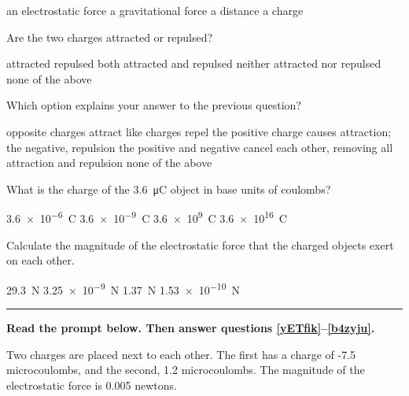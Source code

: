 \documentclass{exam}
\begin{document}
\begin{questions}
\begin{randomizechoices}
    \correctchoice an electrostatic force
    \choice a gravitational force
    \choice a distance
    \choice a charge
\end{randomizechoices}

\question
Are the two charges attracted or repulsed?

\begin{randomizechoices}[keeplast]
    \choice attracted
    \correctchoice repulsed
    \choice both attracted and repulsed
    \choice neither attracted nor repulsed
    \choice none of the above
\end{randomizechoices}

\question
Which option explains your answer to the previous question?

\begin{randomizechoices}[keeplast]
    \choice opposite charges attract
    \correctchoice like charges repel
    \choice the positive charge causes attraction; the negative, repulsion
    \choice the positive and negative cancel each other, removing all attraction and repulsion
    \choice none of the above
\end{randomizechoices}

\question
What is the charge of the \qty{3.6}{\micro C} object in base units of coulombs?

\begin{randomizechoices}
    \correctchoice \qty{3.6e-6}{C}
    \choice \qty{3.6e-9}{C}
    \choice \qty{3.6e9}{C}
    \choice \qty{3.6e16}{C}
\end{randomizechoices}

\question \label{Fxl8ta}
Calculate the magnitude of the electrostatic force that the charged objects exert on each other.

\begin{randomizechoices}
    \correctchoice \qty{29.3}{N}
    \choice \qty{3.25e-9}{N}
    \choice \qty{1.37}{N}
    \choice \qty{1.53e-10}{N}
\end{randomizechoices}
\vspace{1em}
\hrule

\clearpage
\begin{EnvUplevel}
     \textbf{Read the prompt below. Then answer questions \ref{yETfik}--\ref{b4zyju}.}

    Two charges are placed next to each other. The first has a charge of -7.5 microcoulombs, and the second, 1.2 microcoulombs. The magnitude of the electrostatic force is 0.005 newtons.  
\end{EnvUplevel}





\end{questions}
\end{document}
